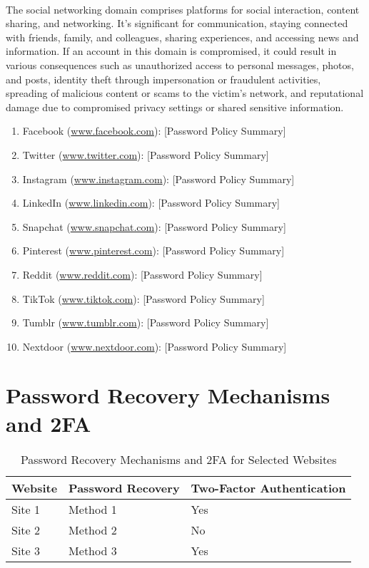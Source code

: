 \documentclass{article}
\begin{document}
\paragraph{} The social networking domain comprises platforms for social interaction, content sharing, and networking. It's significant for communication, staying connected with friends, family, and colleagues, sharing experiences, and accessing news and information. If an account in this domain is compromised, it could result in various consequences such as unauthorized access to personal messages, photos, and posts, identity theft through impersonation or fraudulent activities, spreading of malicious content or scams to the victim's network, and reputational damage due to compromised privacy settings or shared sensitive information.
\begin{enumerate}
    \item Facebook (\url{www.facebook.com}): [Password Policy Summary]
    \item Twitter (\url{www.twitter.com}): [Password Policy Summary]
    \item Instagram (\url{www.instagram.com}): [Password Policy Summary]
    \item LinkedIn (\url{www.linkedin.com}): [Password Policy Summary]
    \item Snapchat (\url{www.snapchat.com}): [Password Policy Summary]
    \item Pinterest (\url{www.pinterest.com}): [Password Policy Summary]
    \item Reddit (\url{www.reddit.com}): [Password Policy Summary]
    \item TikTok (\url{www.tiktok.com}): [Password Policy Summary]
    \item Tumblr (\url{www.tumblr.com}): [Password Policy Summary]
    \item Nextdoor (\url{www.nextdoor.com}): [Password Policy Summary]
\end{enumerate}

\section{Password Recovery Mechanisms and 2FA}

\begin{table}[h]
\centering
\begin{tabular}{@{}lll@{}}
\toprule
Website & Password Recovery & Two-Factor Authentication \\ \midrule
Site 1  & Method 1           & Yes                       \\
Site 2  & Method 2           & No                        \\
Site 3  & Method 3           & Yes                       \\ \bottomrule
\end{tabular}
\caption{Password Recovery Mechanisms and 2FA for Selected Websites}
\label{tab:recovery}
\end{table}
\end{document}
